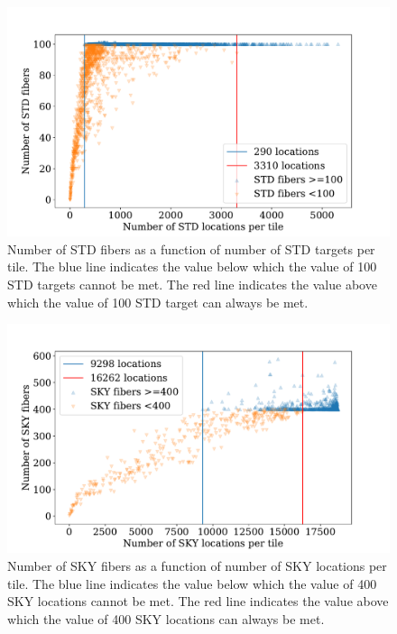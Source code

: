 \documentclass{article}
\begin{document}
\begin{figure}[!h]
\begin{center}
\begin{center}
\includegraphics[scale=0.40]{std_density.pdf}
\end{center}
\caption{Number of STD fibers as a function of number of STD targets
  per tile. 
The blue line indicates the value below which the value of 100 STD
targets cannot be met. 
The red line indicates the value above which the value of 100 STD
target can always be met.
\label{fig:std_dens}}
\end{center}
\end{figure}


\begin{figure}[!h]
\begin{center}
\begin{center}
\includegraphics[scale=0.40]{sky_density.pdf}
\end{center}
\caption{Number of SKY fibers as a function of number of SKY locations
  per tile. 
The blue line indicates the value below which the value of 400 SKY 
locations cannot be met. 
The red line indicates the value above which the value of 400 SKY
locations can always be met.
\label{fig:sky_dens}}
\end{center}
\end{figure}
\end{document}
